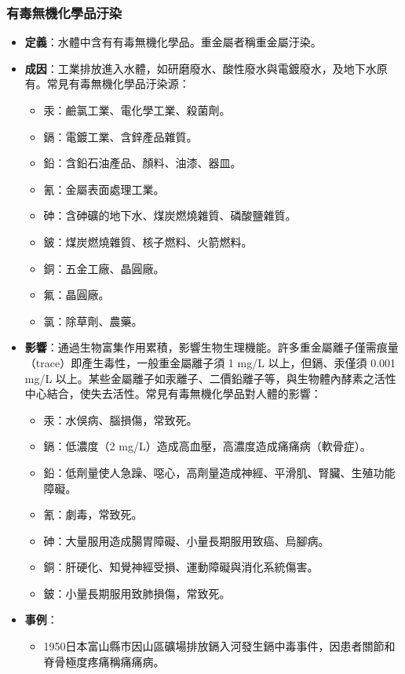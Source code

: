 \documentclass[a4paper,12pt]{report}
\begin{document}
\begin{itemize}
\subsubsection{有毒無機化學品汙染}
\begin{itemize}
    \item \textbf{定義}：水體中含有有毒無機化學品。重金屬者稱重金屬汙染。
    \item \textbf{成因}：工業排放進入水體，如研磨廢水、酸性廢水與電鍍廢水，及地下水原有。常見有毒無機化學品汙染源：
\begin{itemize}
\item 汞：鹼氯工業、電化學工業、殺菌劑。
\item 鎘：電鍍工業、含鋅產品雜質。
\item 鉛：含鉛石油產品、顏料、油漆、器皿。
\item 氰：金屬表面處理工業。
\item 砷：含砷礦的地下水、煤炭燃燒雜質、磷酸鹽雜質。
\item 鈹：煤炭燃燒雜質、核子燃料、火箭燃料。
\item 銅：五金工廠、晶圓廠。
\item 氟：晶圓廠。
\item 氯：除草劑、農藥。
\end{itemize}
    \item \textbf{影響}：通過生物富集作用累積，影響生物生理機能。許多重金屬離子僅需痕量（trace）即產生毒性，一般重金屬離子須 1 mg/L 以上，但鎘、汞僅須 0.001 mg/L 以上。某些金屬離子如汞離子、二價鉛離子等，與生物體內酵素之活性中心結合，使失去活性。常見有毒無機化學品對人體的影響：
\begin{itemize}
\item 汞：水俁病、腦損傷，常致死。
\item 鎘：低濃度（2 mg/L）造成高血壓，高濃度造成痛痛病（軟骨症）。
\item 鉛：低劑量使人急躁、噁心，高劑量造成神經、平滑肌、腎臟、生殖功能障礙。
\item 氰：劇毒，常致死。
\item 砷：大量服用造成腸胃障礙、小量長期服用致癌、烏腳病。
\item 銅：肝硬化、知覺神經受損、運動障礙與消化系統傷害。
\item 鈹：小量長期服用致肺損傷，常致死。
\end{itemize}
    \item \textbf{事例}：
    \begin{itemize}
    \item 1950日本富山縣市因山區礦場排放鎘入河發生鎘中毒事件，因患者關節和脊骨極度疼痛稱痛痛病。

\end{itemize}
\end{itemize}
\end{itemize}
\end{document}
